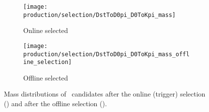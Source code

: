 \begin{figure}
  \begin{subfigure}[b]{0.5\textwidth}
    \centering
    \texttt{[image: production/selection/DstToD0pi\_D0ToKpi\_mass]}
    \caption{Online selected}
    \label{fig:prod:sel:DstToD0pi_D0ToKpi:online}
  \end{subfigure}
  \begin{subfigure}[b]{0.5\textwidth}
    \centering
    \texttt{[image: production/selection/DstToD0pi\_D0ToKpi\_mass\_offline\_selection]}
    \caption{Offline selected}
    \label{fig:prod:sel:DstToD0pi_D0ToKpi:offline}
  \end{subfigure}
  \caption{%
    Mass distributions of \DstToDzpi\ candidates after the online (trigger) 
    selection () and after the 
    offline selection ().
  }
  \label{fig:prod:sel:DstToD0pi_D0ToKpi}
\end{figure}

\begin{table}
  \caption{%
    Number of candidates before and after the offline selection for each charm 
    candidate under study.
    The uncertainties given on the counts assuming Poisson statistics, and the 
    uncertainties given on the ratios assume binomial statistics.
  }
  \label{tab:prod:sel:candidates}
  \centering
  
\end{table}
